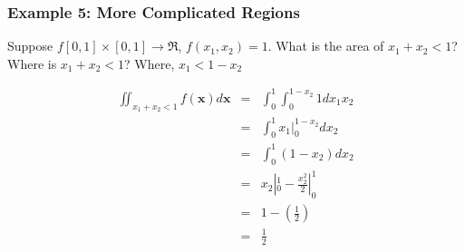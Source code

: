 \documentclass{beamer}
\numberwithin{equation}{section}
\begin{document}
\begin{frame}
\frametitle{Example 5: More Complicated Regions}

Suppose $f[0,1] \times [0,1] \rightarrow \Re$, $f(x_{1}, x_{2} ) = 1$.  What is the area of $x_{1} + x_{2} < 1$? 
Where is $x_{1} + x_{2}<1$?  Where, $x_{1} < 1 - x_{2}$ 



\begin{eqnarray}
\iint_{x_{1} + x_{2} < 1} f(\boldsymbol{x})d\boldsymbol{x}  & = & \int_{0}^{1} \int_{0}^{1-x_{2}} 1 dx_{1} x_{2} \nonumber \\
																						&= & \int_{0}^{1} x_{1}|_{0}^{1- x_{2}} dx_{2} \nonumber \\
																						& =& \int_{0} ^{1} (1 - x_{2} ) dx_{2} \nonumber \\
																						& = & x_{2}|_{0}^{1}  - \frac{x_{2}^2}{2}|_{0}^{1} \nonumber \\
																						& = &  1 - (\frac{1}{2}) \nonumber \\
																						& = & \frac{1}{2} \nonumber 
\end{eqnarray}																						


\end{frame}
\end{document}
